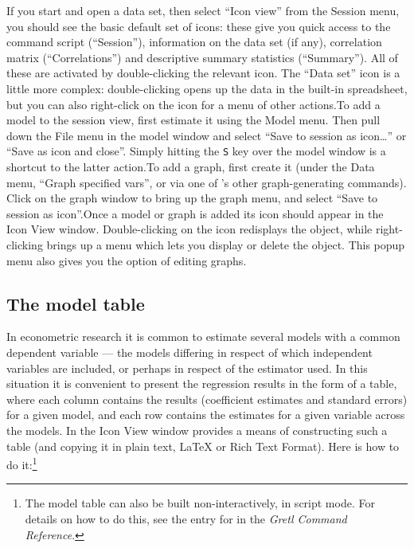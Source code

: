 	If you start  and open a data
	set, then select ``Icon view'' from the Session
	menu, you should see the basic default set of icons: these
	give you quick access to the command script
	(``Session''), information on the data set (if
	any), correlation matrix (``Correlations'') and
	descriptive summary statistics (``Summary''). All
	of these are activated by double-clicking the relevant icon.
	The ``Data set'' icon is a little more complex:
	double-clicking opens up the data in the built-in spreadsheet,
	but you can also right-click on the icon for a menu of other
	actions.To add a model to the session view, first estimate it
	using the Model menu. Then pull down the File menu in the
	model window and select ``Save to session as
	  icon\dots{}'' or ``Save as icon and
	  close''.  Simply hitting the \verb+S+ key
	over the model window is a shortcut to the latter
	action.To add a graph, first create it (under the Data menu,
	``Graph specified vars'', or via one of
	's other graph-generating
	commands).  Click on the graph window to bring up the graph
	menu, and select ``Save to session as
	  icon''.Once a model or graph is added its icon should appear in
	the Icon View window.  Double-clicking on the icon redisplays
	the object, while right-clicking brings up a menu which lets
	you display or delete the object.  This popup menu also gives
	you the option of editing graphs.

\subsection{The model table}
\label{model-table}


	In econometric research it is common to estimate several
	models with a common dependent variable --- the models
	differing in respect of which independent variables are
	included, or perhaps in respect of the estimator used.  In
	this situation it is convenient to present the regression
	results in the form of a table, where each column contains the
	results (coefficient estimates and standard errors) for a
	given model, and each row contains the estimates for a given
	variable across the models.
	In the Icon View window 
	provides a means of constructing such a table (and copying it
	in plain text, {\LaTeX} or Rich Text Format).  Here is how to
	do it:\footnote{The model table can also be built
	    non-interactively, in script mode.  For details on how to
	    do this, see the entry for  in the
	    \emph{Gretl Command Reference}.
	   }
      
